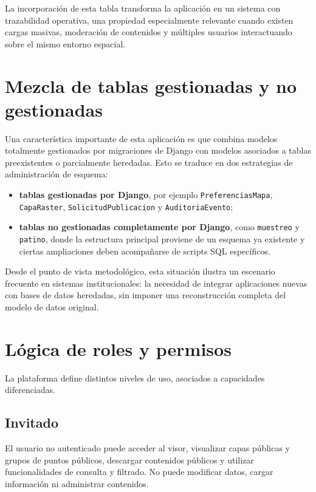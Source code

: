 \documentclass[12pt,a4paper]{report}
\begin{document}
La incorporaci\'on de esta tabla transforma la aplicaci\'on en un sistema con trazabilidad operativa, una propiedad especialmente relevante cuando existen cargas masivas, moderaci\'on de contenidos y m\'ultiples usuarios interactuando sobre el mismo entorno espacial.

\section{Mezcla de tablas gestionadas y no gestionadas}

Una caracter\'istica importante de esta aplicaci\'on es que combina modelos totalmente gestionados por migraciones de Django con modelos asociados a tablas preexistentes o parcialmente heredadas. Esto se traduce en dos estrategias de administraci\'on de esquema:

\begin{itemize}
    \item \textbf{tablas gestionadas por Django}, por ejemplo \texttt{PreferenciasMapa}, \texttt{CapaRaster}, \texttt{SolicitudPublicacion} y \texttt{AuditoriaEvento};
    \item \textbf{tablas no gestionadas completamente por Django}, como \texttt{muestreo} y \texttt{patino}, donde la estructura principal proviene de un esquema ya existente y ciertas ampliaciones deben acompa\~narse de scripts SQL espec\'ificos.
\end{itemize}

Desde el punto de vista metodol\'ogico, esta situaci\'on ilustra un escenario frecuente en sistemas institucionales: la necesidad de integrar aplicaciones nuevas con bases de datos heredadas, sin imponer una reconstrucci\'on completa del modelo de datos original.

\section{L\'ogica de roles y permisos}

La plataforma define distintos niveles de uso, asociados a capacidades diferenciadas.

\subsection{Invitado}

El usuario no autenticado puede acceder al visor, visualizar capas p\'ublicas y grupos de puntos p\'ublicos, descargar contenidos p\'ublicos y utilizar funcionalidades de consulta y filtrado. No puede modificar datos, cargar informaci\'on ni administrar contenidos.
\end{document}
